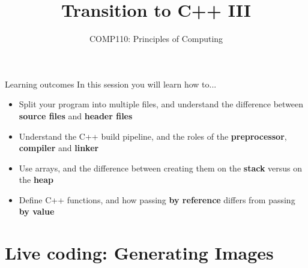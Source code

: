 \documentclass[xcolor={dvipsnames}]{beamer}\usepackage{etoolbox}\newtoggle{printable}\togglefalse{printable}
\begin{document}
\title{Transition to C++ III}   
\subtitle{COMP110: Principles of Computing}

\frame{\titlepage} 

\begin{frame}{Learning outcomes}
    In this session you will learn how to...
    \begin{itemize}
        \item Split your program into multiple files, and understand the difference between
            \textbf{source files} and \textbf{header files}
        \item Understand the C++ build pipeline, and the roles of the \textbf{preprocessor},
            \textbf{compiler} and \textbf{linker}
        \item Use arrays, and the difference between creating them on the \textbf{stack}
            versus on the \textbf{heap}
        \item Define C++ functions, and how passing \textbf{by reference} differs from passing \textbf{by value}
    \end{itemize}
\end{frame}


%
%
%

\part{Live coding: Generating Images}
\frame{\partpage}


%
\end{document}
